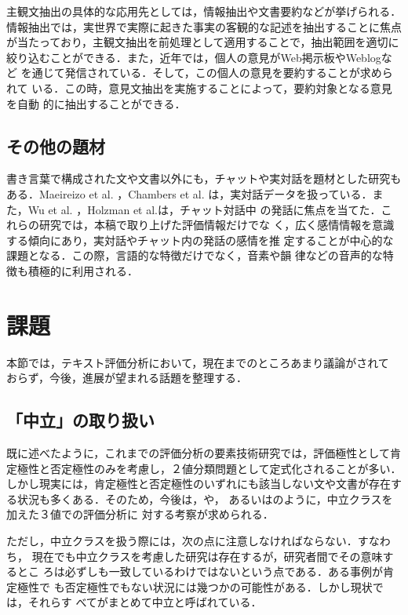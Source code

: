 主観文抽出の具体的な応用先としては，情報抽出や文書要約などが挙げられる．
情報抽出では，実世界で実際に起きた事実の客観的な記述を抽出することに焦点
が当たっており，主観文抽出を前処理として適用することで，抽出範囲を適切に
絞り込むことができる．また，近年では，個人の意見がWeb掲示板やWeblogなど
を通じて発信されている．そして，この個人の意見を要約することが求められて
いる．この時，意見文抽出を実施することによって，要約対象となる意見を自動
的に抽出することができる．

\subsection{その他の題材}
\label{sec:not_text}

書き言葉で構成された文や文書以外にも，チャットや実対話を題材とした研究も
ある．Maeireizo et al. \cite{maeireizo2004a}，Chambers et
al. \cite{chambers2004a}は，実対話データを扱っている．また，Wu et
al. \cite{wu2002a}，Holzman et al.\cite{holzman2003a}は，チャット対話中
の発話に焦点を当てた．これらの研究では，本稿で取り上げた評価情報だけでな
く，広く感情情報を意識する傾向にあり，実対話やチャット内の発話の感情を推
定することが中心的な課題となる．この際，言語的な特徴だけでなく，音素や韻
律などの音声的な特徴も積極的に利用される．

\section{課題}
\label{sec:kadai}

本節では，テキスト評価分析において，現在までのところあまり議論がされて
おらず，今後，進展が望まれる話題を整理する．

\subsection{「中立」の取り扱い}
\label{sec:neutral}

既に述べたように，これまでの評価分析の要素技術研究では，評価極性として肯
定極性と否定極性のみを考慮し，２値分類問題として定式化されることが多い．
しかし現実には，肯定極性と否定極性のいずれにも該当しない文や文書が存在す
る状況も多くある．そのため，今後は，\cite{koppel2005a}や\cite{yu2003a}，
あるいは\cite{suzuki2004a}のように，中立クラスを加えた３値での評価分析に
対する考察が求められる．

ただし，中立クラスを扱う際には，次の点に注意しなければならない．すなわち，
現在でも中立クラスを考慮した研究は存在するが，研究者間でその意味するとこ
ろは必ずしも一致しているわけではないという点である．ある事例が肯定極性で
も否定極性でもない状況には幾つかの可能性がある．しかし現状では，それらす
べてがまとめて中立と呼ばれている．

